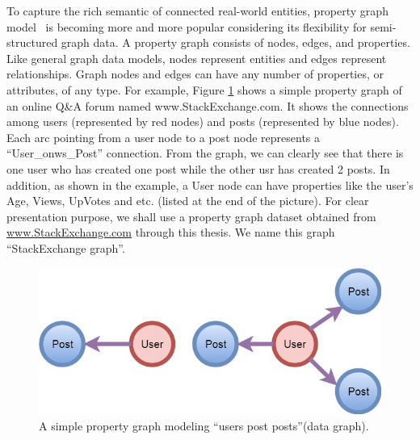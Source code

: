 To capture the rich semantic of connected real-world entities, property graph model~\cite{} is becoming more and more popular considering its flexibility for semi-structured graph data. A property graph consists of nodes, edges, and properties. Like general graph data models, nodes represent entities and edges represent relationships. Graph nodes and edges can have any number of properties, or attributes, of any type. For example, Figure \ref{fig:1} shows a simple property graph of an online Q\&A forum named www.StackExchange.com. It shows the connections among users (represented by red nodes) and posts (represented by blue nodes). Each arc pointing from a user node  to a post node represents a ``User\_onws\_Post'' connection. From the graph, we can clearly see that  there is one user who has created one post while the other usr has created 2 posts. In addition, as shown in the example, a User node can have properties like the user’s Age, Views, UpVotes and etc. (listed at the end of the picture). 
For clear presentation purpose, we shall use a property graph dataset obtained from \url{www.StackExchange.com} through this thesis. We name this graph ``StackExchange graph''. 


\begin{figure}
\centering
\includegraphics[scale=0.4]{pic/11.jpg}
\caption{A simple property graph modeling ``users post posts''(data graph).}
\label{fig:1}
\end{figure}




 

